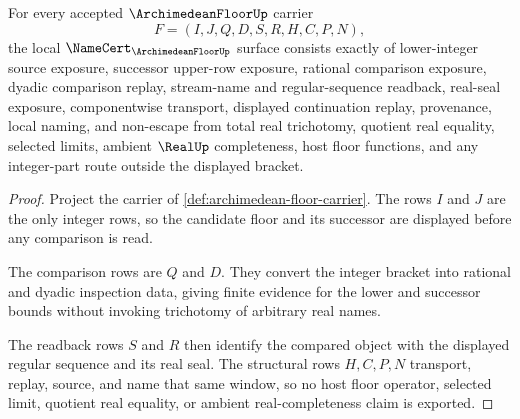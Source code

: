 \begin{theorem}
\label{thm:archimedean-floor-namecert-obligations}
For every accepted $\ArchimedeanFloorUp$ carrier
$$
F=(I,J,Q,D,S,R,H,C,P,N),
$$
the local $\NameCert_{\ArchimedeanFloorUp}$ surface consists exactly of lower-integer source exposure, successor upper-row exposure, rational comparison exposure, dyadic comparison replay, stream-name and regular-sequence readback, real-seal exposure, componentwise transport, displayed continuation replay, provenance, local naming, and non-escape from total real trichotomy, quotient real equality, selected limits, ambient $\RealUp$ completeness, host floor functions, and any integer-part route outside the displayed bracket.
\end{theorem}
\begin{proof}
Project the carrier of \autoref{def:archimedean-floor-carrier}. The rows $I$ and $J$ are the only integer rows, so the candidate floor and its successor are displayed before any comparison is read.

The comparison rows are $Q$ and $D$. They convert the integer bracket into rational and dyadic inspection data, giving finite evidence for the lower and successor bounds without invoking trichotomy of arbitrary real names.

The readback rows $S$ and $R$ then identify the compared object with the displayed regular sequence and its real seal. The structural rows $H,C,P,N$ transport, replay, source, and name that same window, so no host floor operator, selected limit, quotient real equality, or ambient real-completeness claim is exported.
\end{proof}

